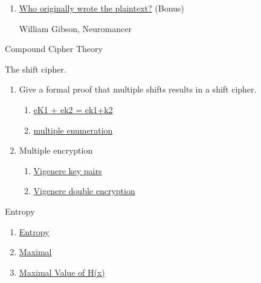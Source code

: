 \documentclass{assignment}
\begin{document}
\begin{problemlist}
\begin{problem}
\begin{answer}
\begin{enumerate}
					\item \underline{Who originally wrote the plaintext?} (Bonus)
					\begin{center}
						\par William Gibson, Neuromancer
					\end{center}
				\end{enumerate}
			\end{answer}
		\end{problem}
		\newpage
		\pbitem Compound Cipher Theory
		\begin{problem}
			The shift cipher.
			\begin{answer}
				\begin{enumerate}
					\item  Give a formal proof that multiple shifts results in a shift cipher.
						\begin{enumerate}
							\item \underline{eK1 + ek2 = ek1+k2}
							\item \underline{multiple enumeration}
						\end{enumerate}
					\item Multiple encryption
						\begin{enumerate}
							\item \underline{Vigenere key pairs}
							\item \underline{Vigenere double encryption}
						\end{enumerate}
				\end{enumerate}
			\end{answer}
		\end{problem}
		\newpage
		\pbitem Entropy
		\begin{problem}
			\begin{answer}
				\begin{enumerate}
					\item \underline{Entropy}
					\item \underline{Maximal}
					\item \underline{Maximal Value of H(x)}
				\end{enumerate}
			\end{answer}
		\end{problem}
		\newpage

\end{problemlist}
\end{document}
